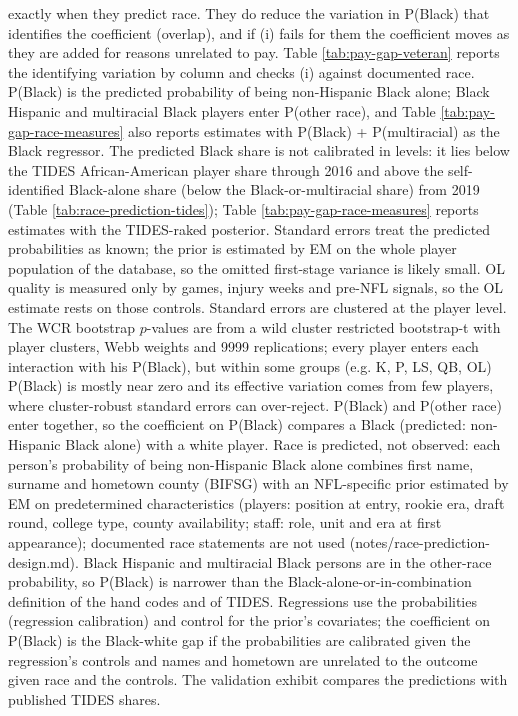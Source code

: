 {exactly when they predict race. They do reduce the variation in P(Black) that identifies the coefficient (overlap), and if (i) fails for them the coefficient moves as they are added for reasons unrelated to pay. Table \ref{tab:pay-gap-veteran} reports the identifying variation by column and checks (i) against documented race. P(Black) is the predicted probability of being non-Hispanic Black alone; Black Hispanic and multiracial Black players enter P(other race), and Table \ref{tab:pay-gap-race-measures} also reports estimates with P(Black) + P(multiracial) as the Black regressor. The predicted Black share is not calibrated in levels: it lies below the TIDES African-American player share through 2016 and above the self-identified Black-alone share (below the Black-or-multiracial share) from 2019 (Table \ref{tab:race-prediction-tides}); Table \ref{tab:pay-gap-race-measures} reports estimates with the TIDES-raked posterior. Standard errors treat the predicted probabilities as known; the prior is estimated by EM on the whole player population of the database, so the omitted first-stage variance is likely small. OL quality is measured only by games, injury weeks and pre-NFL signals, so the OL estimate rests on those controls. Standard errors are clustered at the player level. The WCR bootstrap $p$-values are from a wild cluster restricted bootstrap-t with player clusters, Webb weights and 9999 replications; every player enters each interaction with his P(Black), but within some groups (e.g. K, P, LS, QB, OL) P(Black) is mostly near zero and its effective variation comes from few players, where cluster-robust standard errors can over-reject. P(Black) and P(other race) enter together, so the coefficient on P(Black) compares a Black (predicted: non-Hispanic Black alone) with a white player. Race is predicted, not observed: each person's probability of being non-Hispanic Black alone combines first name, surname and hometown county (BIFSG) with an NFL-specific prior estimated by EM on predetermined characteristics (players: position at entry, rookie era, draft round, college type, county availability; staff: role, unit and era at first appearance); documented race statements are not used (notes/race-prediction-design.md). Black Hispanic and multiracial Black persons are in the other-race probability, so P(Black) is narrower than the Black-alone-or-in-combination definition of the hand codes and of TIDES. Regressions use the probabilities (regression calibration) and control for the prior's covariates; the coefficient on P(Black) is the Black-white gap if the probabilities are calibrated given the regression's controls and names and hometown are unrelated to the outcome given race and the controls. The validation exhibit compares the predictions with published TIDES shares.
\par}

